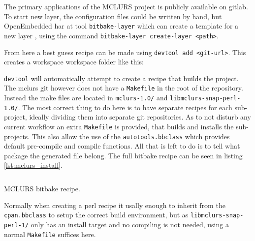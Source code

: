 \documentclass[../../main.tex]{subfiles}
\begin{document}
The primary applications of the MCLURS project is publicly available on gitlab\cite{mclurs-git}.
To start new layer, the configuration files could be written by hand, but
OpenEmbedded har at tool \texttt{bitbake-layer} which can create
a template for a new layer , using the command \texttt{bitbake-layer create-layer <path>}. 

From here a best guess recipe can be made using \texttt{devtool add <git-url>}.
This creates a workspace workspace folder like this:

\texttt{devtool} will automatically attempt to create a recipe that builds the project.
The mclurs git however does not have a \texttt{Makefile} in the root of the repository.
Instead the make files are located in \texttt{mclurs-1.0/} and
\texttt{libmclurs-snap-perl-1.0/}.
The most correct thing to do here is to have separate recipes for each sub-project, ideally
dividing them into separate git repositories.
As to not disturb any current workflow an extra \texttt{Makefile} is provided, that
builds and installs the sub-projects. This also allow the use of the
\texttt{autotools.bbclass} which provides default pre-compile and compile functions.
All that is left to do is to tell what package the generated file belong.
The full bitbake recipe can be seen in listing \ref{lst:mclurs_install}.

\begin{listing}
	\inputminted[firstline=13]{bitbake}{/home/aske/Bachelor/mender-raspberrypi/meta-mclurs/recipes-mclurs/mclurs/mclurs_git.bb}
\caption{MCLURS bitbake recipe.}
\label{lst:mclurs_install}
\end{listing}

Normally when creating a perl recipe it usally enough to inherit from the
\texttt{cpan.bbclass} to setup the correct build environment, but as
\texttt{libmclurs-snap-perl-1/} only has an install target and no compiling
is not needed, using a normal \texttt{Makefile} suffices here.\\
\end{document}

